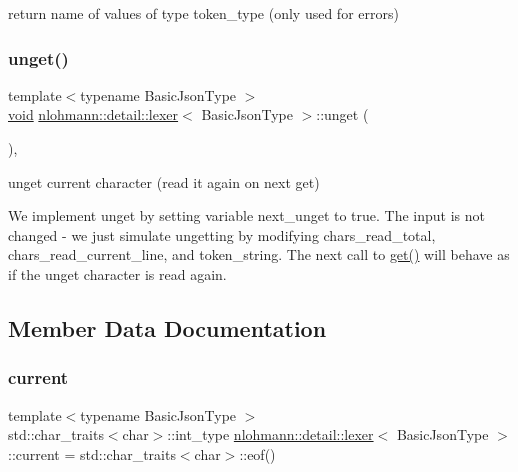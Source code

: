 return name of values of type token\+\_\+type (only used for errors) 

\mbox{\label{classnlohmann_1_1detail_1_1lexer_a626f145768762057dc68a4666eb577db}} 
\subsubsection{\texorpdfstring{unget()}{unget()}}
{\footnotesize\ttfamily template$<$typename Basic\+Json\+Type $>$ \\
\mbox{\hyperlink{namespacenlohmann_1_1detail_a59fca69799f6b9e366710cb9043aa77d}{void}} \mbox{\hyperlink{classnlohmann_1_1detail_1_1lexer}{nlohmann\+::detail\+::lexer}}$<$ Basic\+Json\+Type $>$\+::unget (\begin{DoxyParamCaption}{ }\end{DoxyParamCaption})\hspace{0.3cm}{\ttfamily [inline]}, {\ttfamily [private]}}



unget current character (read it again on next get) 

We implement unget by setting variable next\+\_\+unget to true. The input is not changed -\/ we just simulate ungetting by modifying chars\+\_\+read\+\_\+total, chars\+\_\+read\+\_\+current\+\_\+line, and token\+\_\+string. The next call to \mbox{\hyperlink{classnlohmann_1_1detail_1_1lexer_a901e45a34e1fb1d97ab62350b0c3ef26}{get()}} will behave as if the unget character is read again. 

\subsection{Member Data Documentation}
\mbox{\label{classnlohmann_1_1detail_1_1lexer_a47169f9aaf0da4c9885e61d3109859aa}} 
\subsubsection{\texorpdfstring{current}{current}}
{\footnotesize\ttfamily template$<$typename Basic\+Json\+Type $>$ \\
std\+::char\+\_\+traits$<$char$>$\+::int\+\_\+type \mbox{\hyperlink{classnlohmann_1_1detail_1_1lexer}{nlohmann\+::detail\+::lexer}}$<$ Basic\+Json\+Type $>$\+::current = std\+::char\+\_\+traits$<$char$>$\+::eof()\hspace{0.3cm}{\ttfamily [private]}}



